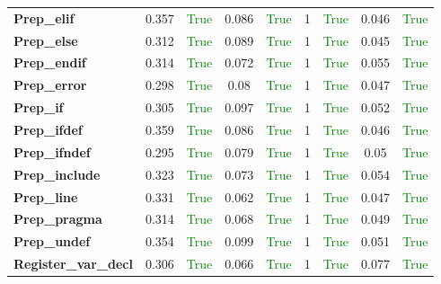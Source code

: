 \documentclass{article}
\begin{document}
\begin{xltabular}{\textwidth}{lcccccccc}
\textbf{{\fontsize{10}{12}\selectfont Prep\_elif}}& 0.357&\textcolor{green}{True}& 0.086&\textcolor{green}{True}& 1&\textcolor{green}{True}& 0.046&\textcolor{green}{True} \\[0.5ex]
\textbf{{\fontsize{10}{12}\selectfont Prep\_else}}& 0.312&\textcolor{green}{True}& 0.089&\textcolor{green}{True}& 1&\textcolor{green}{True}& 0.045&\textcolor{green}{True} \\[0.5ex]
\textbf{{\fontsize{10}{12}\selectfont Prep\_endif}}& 0.314&\textcolor{green}{True}& 0.072&\textcolor{green}{True}& 1&\textcolor{green}{True}& 0.055&\textcolor{green}{True} \\[0.5ex]
\textbf{{\fontsize{10}{12}\selectfont Prep\_error}}& 0.298&\textcolor{green}{True}& 0.08&\textcolor{green}{True}& 1&\textcolor{green}{True}& 0.047&\textcolor{green}{True} \\[0.5ex]
\textbf{{\fontsize{10}{12}\selectfont Prep\_if}}& 0.305&\textcolor{green}{True}& 0.097&\textcolor{green}{True}& 1&\textcolor{green}{True}& 0.052&\textcolor{green}{True} \\[0.5ex]
\textbf{{\fontsize{10}{12}\selectfont Prep\_ifdef}}& 0.359&\textcolor{green}{True}& 0.086&\textcolor{green}{True}& 1&\textcolor{green}{True}& 0.046&\textcolor{green}{True} \\[0.5ex]
\textbf{{\fontsize{10}{12}\selectfont Prep\_ifndef}}& 0.295&\textcolor{green}{True}& 0.079&\textcolor{green}{True}& 1&\textcolor{green}{True}& 0.05&\textcolor{green}{True} \\[0.5ex]
\textbf{{\fontsize{10}{12}\selectfont Prep\_include}}& 0.323&\textcolor{green}{True}& 0.073&\textcolor{green}{True}& 1&\textcolor{green}{True}& 0.054&\textcolor{green}{True} \\[0.5ex]
\textbf{{\fontsize{10}{12}\selectfont Prep\_line}}& 0.331&\textcolor{green}{True}& 0.062&\textcolor{green}{True}& 1&\textcolor{green}{True}& 0.047&\textcolor{green}{True} \\[0.5ex]
\textbf{{\fontsize{10}{12}\selectfont Prep\_pragma}}& 0.314&\textcolor{green}{True}& 0.068&\textcolor{green}{True}& 1&\textcolor{green}{True}& 0.049&\textcolor{green}{True} \\[0.5ex]
\textbf{{\fontsize{10}{12}\selectfont Prep\_undef}}& 0.354&\textcolor{green}{True}& 0.099&\textcolor{green}{True}& 1&\textcolor{green}{True}& 0.051&\textcolor{green}{True} \\[0.5ex]
\textbf{{\fontsize{10}{12}\selectfont Register\_var\_decl}}& 0.306&\textcolor{green}{True}& 0.066&\textcolor{green}{True}& 1&\textcolor{green}{True}& 0.077&\textcolor{green}{True} \\[0.5ex]

\end{xltabular}
\end{document}
